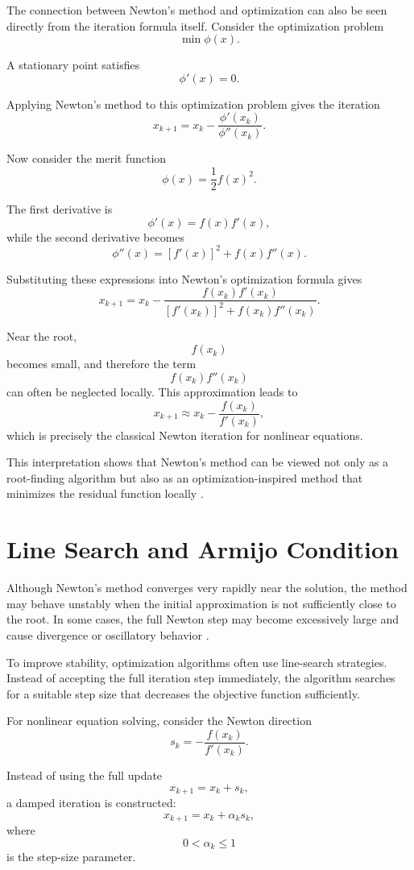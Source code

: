 The connection between Newton's method and optimization can also be seen directly from the iteration formula itself. Consider the optimization problem
\[
\min \phi(x).
\]

A stationary point satisfies
\[
\phi'(x)=0.
\]

Applying Newton's method to this optimization problem gives the iteration
\[
x_{k+1}
=
x_k
-
\frac{\phi'(x_k)}{\phi''(x_k)}.
\]

Now consider the merit function
\[
\phi(x)
=
\frac{1}{2}f(x)^2.
\]

The first derivative is
\[
\phi'(x)
=
f(x)f'(x),
\]
while the second derivative becomes
\[
\phi''(x)
=
[f'(x)]^2
+
f(x)f''(x).
\]

Substituting these expressions into Newton's optimization formula gives
\[
x_{k+1}
=
x_k
-
\frac{
f(x_k)f'(x_k)
}{
[f'(x_k)]^2
+
f(x_k)f''(x_k)
}.
\]

Near the root,
\[
f(x_k)
\]
becomes small, and therefore the term
\[
f(x_k)f''(x_k)
\]
can often be neglected locally. This approximation leads to
\[
x_{k+1}
\approx
x_k
-
\frac{f(x_k)}{f'(x_k)},
\]
which is precisely the classical Newton iteration for nonlinear equations.

This interpretation shows that Newton's method can be viewed not only as a root-finding algorithm but also as an optimization-inspired method that minimizes the residual function locally \cite{kelley, nocedal}.

\section{Line Search and Armijo Condition}

Although Newton's method converges very rapidly near the solution, the method may behave unstably when the initial approximation is not sufficiently close to the root. In some cases, the full Newton step may become excessively large and cause divergence or oscillatory behavior \cite{kelley}.

To improve stability, optimization algorithms often use line-search strategies. Instead of accepting the full iteration step immediately, the algorithm searches for a suitable step size that decreases the objective function sufficiently.

For nonlinear equation solving, consider the Newton direction
\[
s_k
=
-
\frac{f(x_k)}{f'(x_k)}.
\]

Instead of using the full update
\[
x_{k+1}=x_k+s_k,
\]
a damped iteration is constructed:
\[
x_{k+1}
=
x_k+\alpha_k s_k,
\]
where
\[
0<\alpha_k\leq1
\]
is the step-size parameter.

